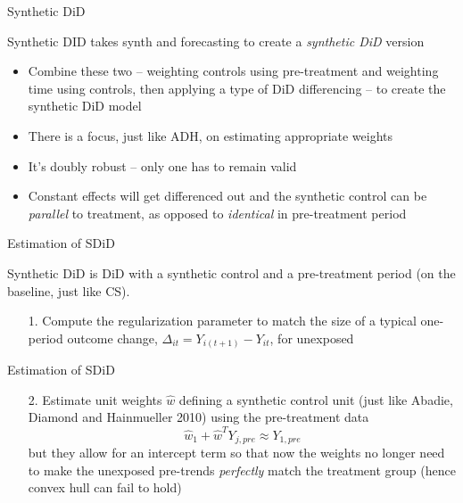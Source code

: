 \documentclass{beamer}
\begin{document}
\begin{frame}{Synthetic DiD}

Synthetic DID takes synth and forecasting to create a \emph{synthetic DiD} version
\begin{itemize}
\item Combine these two -- weighting controls using pre-treatment and weighting time using controls, then applying a type of DiD differencing -- to create the synthetic DiD model
\item There is a focus, just like ADH, on estimating appropriate weights
\item It's doubly robust -- only one has to remain valid
\item Constant effects will get differenced out and the synthetic control can be \emph{parallel} to treatment, as opposed to \emph{identical} in pre-treatment period
\end{itemize}

\end{frame}


\begin{frame}{Estimation of SDiD}

Synthetic DiD is DiD with a synthetic control and a pre-treatment period (on the baseline, just like CS). 
	\begin{enumerate}
	\item[1. ] Compute the regularization parameter to match the size of a typical one-period outcome change, $\Delta_{it} = Y_{i(t+1)} - Y_{it}$, for unexposed 
	\end{enumerate}

\end{frame}


\begin{frame}{Estimation of SDiD}

	\begin{enumerate}

	\item[2. ] Estimate unit weights $\widehat{w}$ defining a synthetic control unit (just like Abadie, Diamond and Hainmueller 2010) using the pre-treatment data $$\widehat{w}_1 + \widehat{w}^TY_{j,pre} \approx Y_{1,pre}$$ but they allow for an intercept term so that now the weights no longer need to make the unexposed pre-trends \emph{perfectly} match the treatment group (hence convex hull can fail to hold)
	\end{enumerate}

\end{frame}
\end{document}
